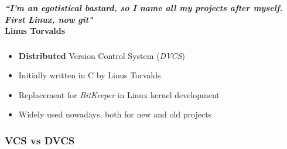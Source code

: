 {
\begin{frame}[plain]
  \begin{center}
    \vspace{140pt}\color{White}
    \textbf{\textit{``I'm an egotistical bastard, so I name all my projects after myself. First Linux, now git"}\\\vspace{10pt}
    Linus Torvalds}
  \end{center}
\end{frame}
}


\begin{frame}
  \frametitle{\insertsubsection}

  \begin{itemize}
    \item \textbf{Distributed} Version Control System (\textit{DVCS}) \vspacing
    \item Initially written in C by Linus Torvalds\vspacing
    \item Replacement for \textit{BitKeeper} in Linux kernel development \vspacing
    \item Widely used nowadays, both for new and old projects
  \end{itemize}
\end{frame}


\subsubsection{VCS vs DVCS}


